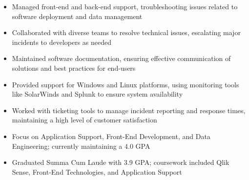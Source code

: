 \par\smallskip
\noindent
\begin{minipage}{20cm}
  \begin{minipage}{9.75cm}
    \begin{itemize}
      \item Managed front-end and back-end support, troubleshooting issues related to software deployment and data management
      \item Collaborated with diverse teams to resolve technical issues, escalating major incidents to developers as needed
      \item Maintained software documentation, ensuring effective communication of solutions and best practices for end-users
    \end{itemize}
  \end{minipage}
  \hfill
  \begin{minipage}{9.75cm}
    \begin{itemize}
      \item Provided support for Windows and Linux platforms, using monitoring tools like SolarWinds and Splunk to ensure system availability
      \item Worked with ticketing tools to manage incident reporting and response times, maintaining a high level of customer satisfaction
    \end{itemize}
  \end{minipage}
\end{minipage}

\begin{itemize}
  \item Focus on Application Support, Front-End Development, and Data Engineering; currently maintaining a 4.0 GPA
\end{itemize}
\divider

\begin{itemize}
  \item Graduated Summa Cum Laude with 3.9 GPA; coursework included Qlik Sense, Front-End Technologies, and Application Support
\end{itemize}

\noindent
\begin{minipage}{20cm}
      
     
     
\end{minipage}


